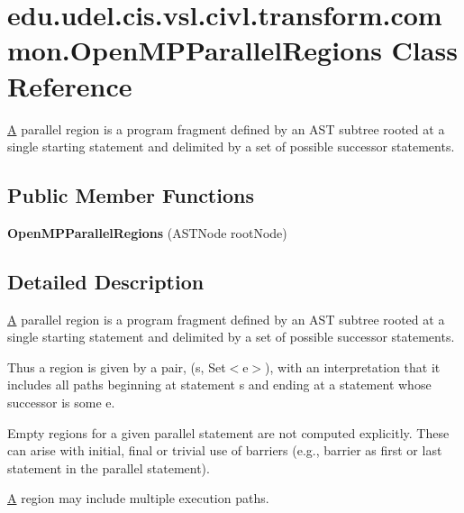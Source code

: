 \hypertarget{classedu_1_1udel_1_1cis_1_1vsl_1_1civl_1_1transform_1_1common_1_1OpenMPParallelRegions}{}\section{edu.\+udel.\+cis.\+vsl.\+civl.\+transform.\+common.\+Open\+M\+P\+Parallel\+Regions Class Reference}
\label{classedu_1_1udel_1_1cis_1_1vsl_1_1civl_1_1transform_1_1common_1_1OpenMPParallelRegions}


\hyperlink{structA}{A} parallel region is a program fragment defined by an A\+S\+T subtree rooted at a single starting statement and delimited by a set of possible successor statements.  


\subsection*{Public Member Functions}
\begin{DoxyCompactItemize}
\item 
\hypertarget{classedu_1_1udel_1_1cis_1_1vsl_1_1civl_1_1transform_1_1common_1_1OpenMPParallelRegions_ad4fa87ba11612a5513793a3b6eff0c26}{}{\bfseries Open\+M\+P\+Parallel\+Regions} (A\+S\+T\+Node root\+Node)\label{classedu_1_1udel_1_1cis_1_1vsl_1_1civl_1_1transform_1_1common_1_1OpenMPParallelRegions_ad4fa87ba11612a5513793a3b6eff0c26}

\end{DoxyCompactItemize}


\subsection{Detailed Description}
\hyperlink{structA}{A} parallel region is a program fragment defined by an A\+S\+T subtree rooted at a single starting statement and delimited by a set of possible successor statements. 

Thus a region is given by a pair, (s, Set$<$e$>$), with an interpretation that it includes all paths beginning at statement s and ending at a statement whose successor is some e.

Empty regions for a given parallel statement are not computed explicitly. These can arise with initial, final or trivial use of barriers (e.\+g., barrier as first or last statement in the parallel statement).

\hyperlink{structA}{A} region may include multiple execution paths.

